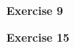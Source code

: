 \documentclass[12pt,oneside]{article}
\newenvironment{exercise}[1]{\vspace{.1in}\noindent\textbf{Exercise #1 \hspace{.05em}}}{}
\begin{document}

\begin{exercise}{9}

\end{exercise}


\begin{exercise}{15}

\end{exercise}


\end{document}
